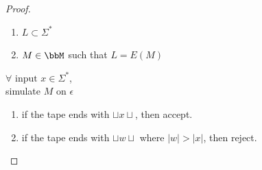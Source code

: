 \documentclass[twoside,11pt]{homework}
\begin{document}
\begin{proof}
  \begin{given}
    \begin{enumerate}
    \item $L \subset \Sigma^*$
    \item $M \in \bbM$ such that $L = E(M)$
    \end{enumerate}
  \end{given}

  \begin{construct}
    $\forall \text{ input } x \in \Sigma^*$, \\
    simulate $M$ on $\epsilon$
    \begin{enumerate}
    \item if the tape ends with $\sqcup x \sqcup$, then accept.
    \item if the tape ends with $\sqcup w \sqcup$ where $|w| > |x|$, then reject.
    \end{enumerate}
    
  \end{construct}
\end{proof}
\end{document}
